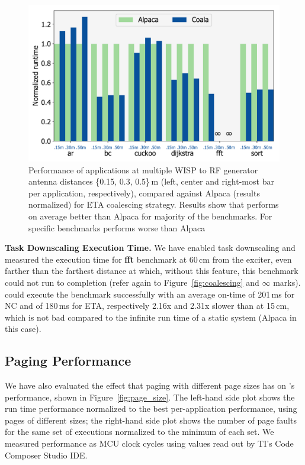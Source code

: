 \begin{figure}
	\centering
	\includegraphics[width=0.5\columnwidth]{figures/coala_alpaca_gcc}
	\caption{Performance of \sys applications at multiple WISP to RF generator antenna distances \{0.15, 0.3, 0.5\}\,m (left, center and right-most bar per application, respectively), compared against Alpaca (results normalized) for ETA coalescing strategy. Results show that \sys performs on average better than Alpaca for majority of the benchmarks. For specific benchmarks \sys performs worse than Alpaca }
	\label{fig:runtime}
\end{figure}

\textbf{Task Downscaling Execution Time.} We have enabled task downscaling and measured the execution time for \textbf{fft} benchmark at 60\,cm from the exciter, even farther than the farthest distance at which, without this feature, this benchmark could not run to completion (refer again to Figure~\ref{fig:coalescing} and $\infty$ marks). \sys could execute the benchmark successfully with an average on-time of 201\,ms for NC and of 180\,ms for ETA, respectively 2.16x and 2.31x slower than at 15\,cm, which is not bad compared to the infinite run time of a static system (Alpaca in this case).

\subsection{Paging Performance}
\label{sec:results_memory_management}

We have also evaluated the effect that paging with different page sizes has on \sys's performance, shown in Figure~\ref{fig:page_size}. The left-hand side plot shows the run time performance normalized to the best per-application performance, using pages of different sizes; the right-hand side plot shows the number of page faults for the same set of executions normalized to the minimum of each set. We measured performance as MCU clock cycles using values read out by TI's Code Composer Studio IDE. 

